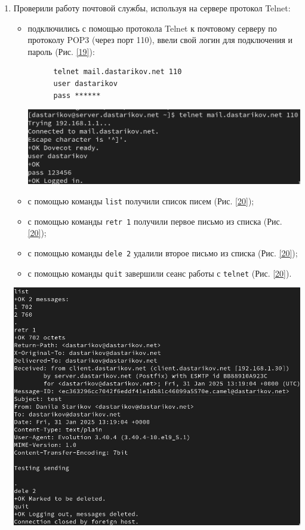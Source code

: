 \begin{enumerate}
\item Проверили работу почтовой службы, используя на сервере протокол Telnet:
  \begin{itemize}
  \item подключились с помощью протокола Telnet к почтовому серверу по протоколу POP3 (через порт 110), ввели свой логин для подключения и пароль (Рис. \ref{19}):
    \begin{verbatim}
      telnet mail.dastarikov.net 110
      user dastarikov
      pass ******
    \end{verbatim}
\begin{center}
    \centering
    \includegraphics[width=\textwidth]{../images/image19.png}
    \label{19}
\end{center}
  \item с помощью команды \texttt{list} получили список писем (Рис. \ref{20});
  \item с помощью команды \texttt{retr 1} получили первое письмо из списка (Рис. \ref{20});
  \item с помощью команды \texttt{dele 2} удалили второе письмо из списка (Рис. \ref{20});
  \item с помощью команды \texttt{quit} завершили сеанс работы с \texttt{telnet} (Рис. \ref{20}).
  \end{itemize}
\begin{center}
    \centering
    \includegraphics[width=\textwidth]{../images/image20.png}
    \label{20}
\end{center}

\end{enumerate}
